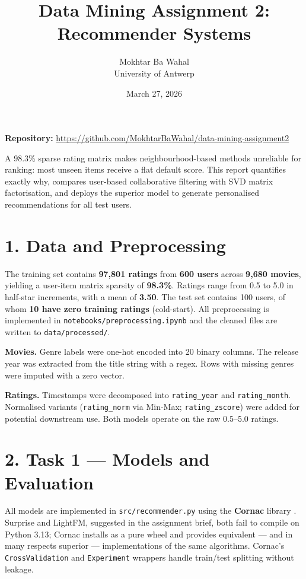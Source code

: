 \documentclass[11pt,a4paper]{article}
\title{\textbf{Data Mining Assignment 2: Recommender Systems}}
\author{Mokhtar Ba Wahal\\ University of Antwerp}
\date{March 27, 2026}
\begin{document}
\maketitle

\textbf{Repository:} \url{https://github.com/MokhtarBaWahal/data-mining-assignment2}

A 98.3\% sparse rating matrix makes neighbourhood-based methods unreliable for ranking: most unseen items receive a flat default score. This report quantifies exactly why, compares user-based collaborative filtering with SVD matrix factorisation, and deploys the superior model to generate personalised recommendations for all test users.

\section*{1. Data and Preprocessing}

The training set contains \textbf{97,801 ratings} from \textbf{600 users} across \textbf{9,680 movies}, yielding a user-item matrix sparsity of \textbf{98.3\%}. Ratings range from 0.5 to 5.0 in half-star increments, with a mean of \textbf{3.50}. The test set contains 100 users, of whom \textbf{10 have zero training ratings} (cold-start). All preprocessing is implemented in \texttt{notebooks/preprocessing.ipynb} and the cleaned files are written to \texttt{data/processed/}.

\textbf{Movies.} Genre labels were one-hot encoded into 20 binary columns. The release year was extracted from the title string with a regex. Rows with missing genres were imputed with a zero vector.

\textbf{Ratings.} Timestamps were decomposed into \texttt{rating\_year} and \texttt{rating\_month}. Normalised variants (\texttt{rating\_norm} via Min-Max; \texttt{rating\_zscore}) were added for potential downstream use. Both models operate on the raw 0.5--5.0 ratings.

\section*{2. Task 1 — Models and Evaluation}

All models are implemented in \texttt{src/recommender.py} using the \textbf{Cornac} library \cite{cornac}. Surprise and LightFM, suggested in the assignment brief, both fail to compile on Python 3.13; Cornac installs as a pure wheel and provides equivalent — and in many respects superior — implementations of the same algorithms. Cornac's \texttt{CrossValidation} and \texttt{Experiment} wrappers handle train/test splitting without leakage.
\end{document}
